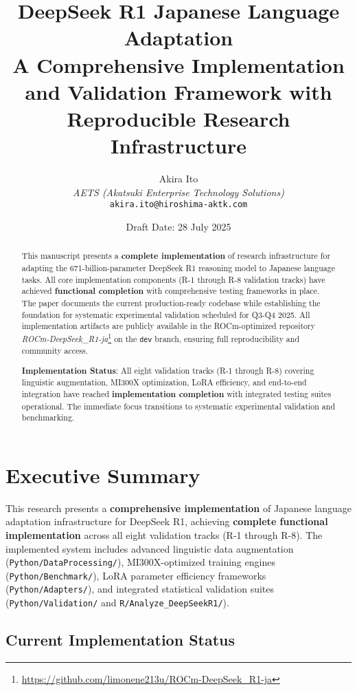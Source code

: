 \documentclass[12pt,a4paper]{article}
\title{\textbf{DeepSeek R1 Japanese Language Adaptation}\\
\large A Comprehensive Implementation and Validation Framework with Reproducible Research Infrastructure}
\author{
Akira Ito\\
\textit{AETS (Akatsuki Enterprise Technology Solutions)}\\
\texttt{akira.ito@hiroshima-aktk.com}
}
\date{Draft Date: 28 July 2025}
\begin{document}
\maketitle

\begin{abstract}
This manuscript presents a \textbf{complete implementation} of research infrastructure for adapting the 671-billion-parameter DeepSeek R1 reasoning model to Japanese language tasks. All core implementation components (R-1 through R-8 validation tracks) have achieved \textbf{functional completion} with comprehensive testing frameworks in place. The paper documents the current production-ready codebase while establishing the foundation for systematic experimental validation scheduled for Q3-Q4 2025. All implementation artifacts are publicly available in the ROCm-optimized repository \textit{ROCm-DeepSeek\_R1-ja}\footnote{\url{https://github.com/limonene213u/ROCm-DeepSeek_R1-ja}} on the \texttt{dev} branch, ensuring full reproducibility and community access.

\textbf{Implementation Status}: All eight validation tracks (R-1 through R-8) covering linguistic augmentation, MI300X optimization, LoRA efficiency, and end-to-end integration have reached \textbf{implementation completion} with integrated testing suites operational. The immediate focus transitions to systematic experimental validation and benchmarking.
\end{abstract}

\tableofcontents
\newpage

\section{Executive Summary}

This research presents a \textbf{comprehensive implementation} of Japanese language adaptation infrastructure for DeepSeek R1, achieving \textbf{complete functional implementation} across all eight validation tracks (R-1 through R-8). The implemented system includes advanced linguistic data augmentation (\texttt{Python/DataProcessing/}), MI300X-optimized training engines (\texttt{Python/Benchmark/}), LoRA parameter efficiency frameworks (\texttt{Python/Adapters/}), and integrated statistical validation suites (\texttt{Python/Validation/} and \texttt{R/Analyze\_DeepSeekR1/}).

\subsection{Current Implementation Status}
\end{document}
